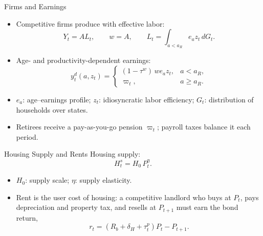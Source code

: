 \documentclass[11pt,aspectratio=169]{beamer}
\newcommand{\1}{\mathbf 1}
\begin{document}
\begin{frame}{Firms and Earnings}
\small
\begin{itemize}
  \item Competitive firms produce with effective labor:
  \[
  Y_t=A L_t,\qquad w=A,\qquad L_t=\int_{a<a_R} e_a z_t\,dG_t.
  \]
  \item Age- and productivity-dependent earnings:
  \[
  y_t^d(a,z_t)=\begin{cases}
  (1-\tau^{w})\,w e_a z_t,&a<a_R,\\
  \varpi_t,&a\geq a_R.
  \end{cases}
  \]
  \item $e_a$: age--earnings profile; $z_t$: idiosyncratic labor efficiency; $G_t$: distribution of households over states.
  \item Retirees receive a pay-as-you-go pension $\varpi_t$; payroll taxes balance it each period.
\end{itemize}
\end{frame}

\begin{frame}{Housing Supply and Rents}
\small
Housing supply:
\[
H_t^s=H_0\,P_t^{\eta}.
\]
\begin{itemize}
  \item $H_0$: supply scale; $\eta$: supply elasticity.
  \item Rent is the user cost of housing: a competitive landlord who buys at $P_t$, pays depreciation and property tax, and resells at $P_{t+1}$ must earn the bond return,
  \[
  r_t=(R_b+\delta_H+\tau_t^p)P_t-P_{t+1}.
  \]
\end{itemize}
\end{frame}
\end{document}
